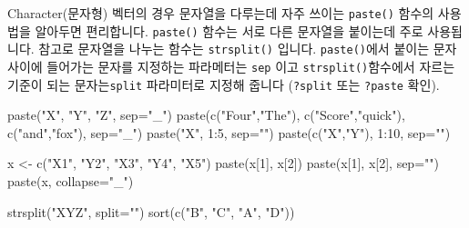\documentclass[
  a4paper,
]{book}
\newenvironment{Shaded}{\begin{snugshade}}{\end{snugshade}}
\newcommand{\AttributeTok}[1]{\textcolor[rgb]{0.40,0.45,0.13}{#1}}
\newcommand{\DecValTok}[1]{\textcolor[rgb]{0.68,0.00,0.00}{#1}}
\newcommand{\FunctionTok}[1]{\textcolor[rgb]{0.28,0.35,0.67}{#1}}
\newcommand{\NormalTok}[1]{\textcolor[rgb]{0.00,0.23,0.31}{#1}}
\newcommand{\OtherTok}[1]{\textcolor[rgb]{0.00,0.23,0.31}{#1}}
\newcommand{\SpecialCharTok}[1]{\textcolor[rgb]{0.37,0.37,0.37}{#1}}
\newcommand{\StringTok}[1]{\textcolor[rgb]{0.13,0.47,0.30}{#1}}
\begin{document}
Character(문자형) 벡터의 경우 문자열을 다루는데 자주 쓰이는
\texttt{paste()} 함수의 사용법을 알아두면 편리합니다. \texttt{paste()}
함수는 서로 다른 문자열을 붙이는데 주로 사용됩니다. 참고로 문자열을
나누는 함수는 \texttt{strsplit()} 입니다. \texttt{paste()}에서 붙이는
문자 사이에 들어가는 문자를 지정하는 파라메터는 \texttt{sep} 이고
\texttt{strsplit()}함수에서 자르는 기준이 되는 문자는\texttt{split}
파라미터로 지정해 줍니다 (\texttt{?split} 또는 \texttt{?paste} 확인).

\begin{Shaded}
\begin{Highlighting}[]
\FunctionTok{paste}\NormalTok{(}\StringTok{"X"}\NormalTok{, }\StringTok{"Y"}\NormalTok{, }\StringTok{"Z"}\NormalTok{, }\AttributeTok{sep=}\StringTok{"\_"}\NormalTok{)}
\FunctionTok{paste}\NormalTok{(}\FunctionTok{c}\NormalTok{(}\StringTok{"Four"}\NormalTok{,}\StringTok{"The"}\NormalTok{), }\FunctionTok{c}\NormalTok{(}\StringTok{"Score"}\NormalTok{,}\StringTok{"quick"}\NormalTok{), }\FunctionTok{c}\NormalTok{(}\StringTok{"and"}\NormalTok{,}\StringTok{"fox"}\NormalTok{), }\AttributeTok{sep=}\StringTok{"\_"}\NormalTok{)}
\FunctionTok{paste}\NormalTok{(}\StringTok{"X"}\NormalTok{, }\DecValTok{1}\SpecialCharTok{:}\DecValTok{5}\NormalTok{, }\AttributeTok{sep=}\StringTok{""}\NormalTok{)}
\FunctionTok{paste}\NormalTok{(}\FunctionTok{c}\NormalTok{(}\StringTok{"X"}\NormalTok{,}\StringTok{"Y"}\NormalTok{), }\DecValTok{1}\SpecialCharTok{:}\DecValTok{10}\NormalTok{, }\AttributeTok{sep=}\StringTok{""}\NormalTok{)}

\NormalTok{x }\OtherTok{\textless{}{-}} \FunctionTok{c}\NormalTok{(}\StringTok{"X1"}\NormalTok{, }\StringTok{"Y2"}\NormalTok{, }\StringTok{"X3"}\NormalTok{, }\StringTok{"Y4"}\NormalTok{, }\StringTok{"X5"}\NormalTok{)}
\FunctionTok{paste}\NormalTok{(x[}\DecValTok{1}\NormalTok{], x[}\DecValTok{2}\NormalTok{])}
\FunctionTok{paste}\NormalTok{(x[}\DecValTok{1}\NormalTok{], x[}\DecValTok{2}\NormalTok{], }\AttributeTok{sep=}\StringTok{""}\NormalTok{)}
\FunctionTok{paste}\NormalTok{(x, }\AttributeTok{collapse=}\StringTok{"\_"}\NormalTok{)}

\FunctionTok{strsplit}\NormalTok{(}\StringTok{"XYZ"}\NormalTok{, }\AttributeTok{split=}\StringTok{""}\NormalTok{)}
\FunctionTok{sort}\NormalTok{(}\FunctionTok{c}\NormalTok{(}\StringTok{"B"}\NormalTok{, }\StringTok{"C"}\NormalTok{, }\StringTok{"A"}\NormalTok{, }\StringTok{"D"}\NormalTok{))}
\end{Highlighting}
\end{Shaded}
\end{document}
